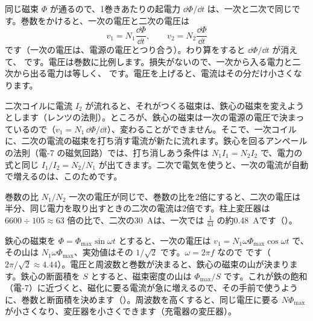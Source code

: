 \noindent 同じ磁束 $\Phi$ が通るので、1巻きあたりの起電力 $\dd\Phi/\dd t$ は、一次と二次で同じです。巻数をかけると、一次の電圧と二次の電圧は
\[v_1=N_1\frac{\dd\Phi}{\dd t},\qquad v_2=N_2\frac{\dd\Phi}{\dd t}\]
です（一次の電圧は、電源の電圧とつり合う）。わり算をすると $\dd\Phi/\dd t$ が消えて、
です。\label{ph:電-12:hen}電圧は巻数に比例します。損失がないので、一次から入る電力と二次から出る電力は等しく、
です。\label{ph:電-12:hen2}電圧を上げると、電流はその分だけ小さくなります。

二次コイルに電流 $I_2$ が流れると、それがつくる磁束は、鉄心の磁束を変えようとします（レンツの法則）。ところが、鉄心の磁束は一次の電源の電圧で決まっているので（$v_1=N_1\,\dd\Phi/\dd t$）、変わることができません。そこで、一次コイルに、二次の電流の磁束を打ち消す電流が新たに流れます。鉄心を回るアンペールの法則（電-7 の磁気回路）では、打ち消しあう条件は $N_1I_1=N_2I_2$ で、電力の式と同じ $I_1/I_2=N_2/N_1$ が出てきます。二次で電気を使うと、一次の電流が自動で増えるのは、このためです。

\begin{phflow}[変圧器]
\end{phflow}

\begin{phbaisuru}{巻数の比 $N_1/N_2$}
一次の電圧が同じで、巻数の比を2倍にすると、二次の電圧は半分、同じ電力を取り出すときの二次の電流は2倍です。柱上変圧器は $6600\div105\approx63$ 倍の比で、二次の\qty{30}{A}は、一次では $\tfrac{1}{63}$ の約\qty{0.48}{A}です（）。
\end{phbaisuru}

\phkokomade


\label{ph:電-12:sec6}
鉄心の磁束を $\Phi=\Phi_{\max}\sin\omega t$ とすると、一次の電圧は $v_1=N_1\omega\Phi_{\max}\cos\omega t$ で、その山は $N_1\omega\Phi_{\max}$、実効値はその $1/\sqrt2$ です。$\omega=2\pi f$ なので
です（$2\pi/\sqrt2\approx4.44$）。電圧と周波数と巻数が決まると、鉄心の磁束の山が決まります。鉄心の断面積を $S$ とすると、磁束密度の山は $\Phi_{\max}/S$ です。これが鉄の飽和（電-7）に近づくと、磁化に要る電流が急に増えるので、その手前で使うように、巻数と断面積を決めます（）。周波数を高くすると、同じ電圧に要る $N\Phi_{\max}$ が小さくなり、変圧器を小さくできます（充電器の変圧器）。

